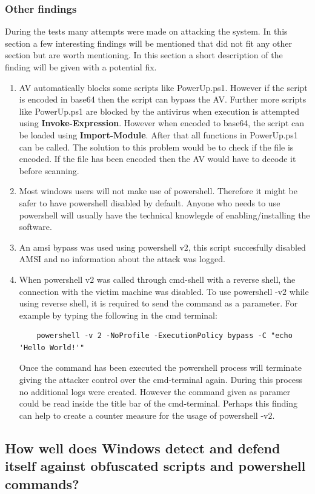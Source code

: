 \documentclass{article}%
\begin{document}
\subsubsection{Other findings}
During the tests many attempts were made on attacking the system. In this section a few interesting findings will be mentioned that did not fit any other section but are worth mentioning. In this section a short description of the finding will be given with a potential fix.
\begin{enumerate}
	\item AV automatically blocks some scripts like PowerUp.ps1. However if the script is encoded in base64 then the script can bypass the AV. Further more scripts like PowerUp.ps1 are blocked by the antivirus when execution is attempted using \textbf{Invoke-Expression}. However when encoded to base64, the script can be loaded using \textbf{Import-Module}. After that all functions in PowerUp.ps1 can be called. The solution to this problem would be to check if the file is encoded. If the file has been encoded then the AV would have to decode it before scanning.
	\item Most windows users will not make use of powershell. Therefore it might be safer to have powershell disabled by default. Anyone who needs to use powershell will usually have the technical knowlegde of enabling/installing the software.
	\item An amsi bypass was used using powershell v$2$, this script succesfully disabled AMSI and no information about the attack was logged.
	\item When powershell v$2$ was called through cmd-shell with a reverse shell, the connection with the victim machine was disabled. To use powershell -v$2$ while using reverse shell, it is required to send the command as a parameter.
	For example by typing the following in the cmd terminal:
	\begin{verbatim}
	powershell -v 2 -NoProfile -ExecutionPolicy bypass -C "echo 'Hello World!'"
	\end{verbatim}
	Once the command has been executed the powershell process will terminate giving the attacker control over the cmd-terminal again. During this process no additional logs were created. However the command given as paramer could be read inside the title bar of the cmd-terminal. Perhaps this finding can help to create a counter measure for the usage of powershell -v$2$.
\end{enumerate}
\subsection{How well does Windows detect and defend itself against obfuscated scripts
and powershell commands?}
\newpage
\end{document}
